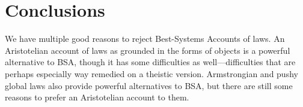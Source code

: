 \section{Conclusions}
We have multiple good reasons to reject Best-Systems Accounts of laws. An Aristotelian account of laws as grounded
in the forms of objects is a powerful alternative to BSA, though it has some difficulties as well---difficulties
that are perhaps especially way remedied on a theistic version. Armstrongian and pushy global laws also provide
powerful alternatives to BSA, but there are still some reasons to prefer an Aristotelian account to them.

\chaptertail
